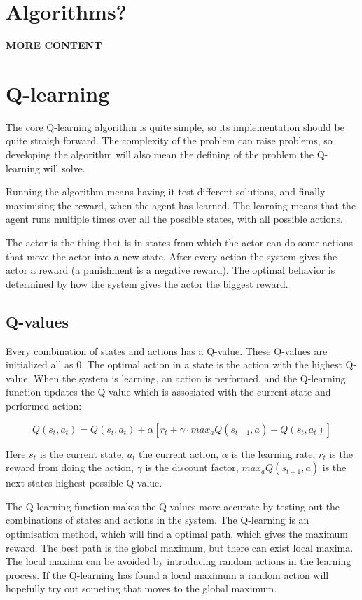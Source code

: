 \documentclass{article}
\begin{document}
\section{Algorithms?}
\textbf{MORE CONTENT}



\section{Q-learning}
The core Q-learning algorithm is quite simple, so its implementation should
be quite straigh forward. The complexity of the problem can raise problems,
so developing the algorithm will also mean the defining of
the problem the Q-learning will solve.

Running the algorithm means having it test different solutions, and finally
maximising the reward, when the agent has learned. The learning means
that the agent runs multiple times over all the possible states,
with all possible actions.

The actor is the thing that is in states from which the actor can do some
actions that move the actor into a new state. After every action the
system gives the actor a reward (a punishment is a negative reward).
The optimal behavior is determined by how the system gives the actor the
biggest reward.


\subsection{Q-values}
Every combination of states and actions has a Q-value. These Q-values are
initialized all as 0. The optimal action in a state is the action with the
highest Q-value. When the system is learning, an action is performed, and the
Q-learning function updates the Q-value which is assosiated with the current
state and performed action:

\[Q(s_t, a_t) = Q(s_t, a_t) + \alpha [ r_t + \gamma \cdot max_aQ(s_{t+1}, a)
- Q(s_t, a_t) ]\]

Here $s_t$ is the current state, $a_t$ the current action,
$\alpha$ is the learning rate, $r_t$ is the reward from doing the action,
$\gamma$ is the discount factor, $max_aQ(s_{t+1}, a)$ is the next states
highest possible Q-value.

The Q-learning function makes the Q-values more accurate by testing out
the combinations of states and actions in the system. The Q-learning is an
optimisation method, which will find a optimal path, which gives the maximum
reward. The best path is the global maximum, but there can exist local maxima.
The local maxima can be avoided by introducing random actions in the learning
process. If the Q-learning has found a local maximum a random action will
hopefully try out someting that moves to the global maximum.
\end{document}

